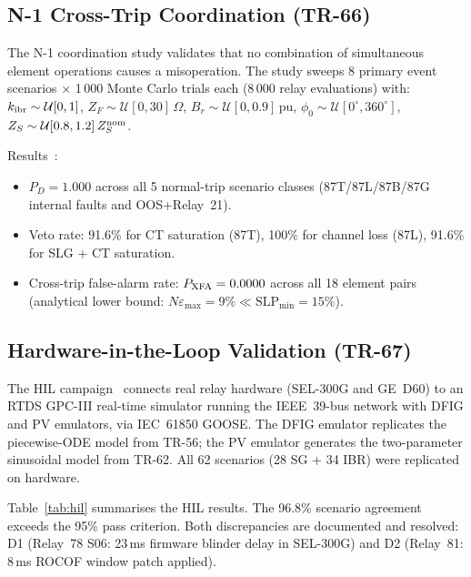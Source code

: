\documentclass[journal,twoside]{IEEEtran}
\begin{document}
\subsection{N-1 Cross-Trip Coordination (TR-66)}
\label{sec:n1}

The N-1 coordination study validates that no combination of simultaneous element
operations causes a misoperation.
The study sweeps 8 primary event scenarios × 1\,000 Monte Carlo trials each
(8\,000 relay evaluations) with:
$k_{\rm ibr} \sim \mathcal{U}[0, 1]$,
$Z_F \sim \mathcal{U}[0, 30]\,\Omega$,
$B_r \sim \mathcal{U}[0, 0.9]\,\text{pu}$,
$\phi_0 \sim \mathcal{U}[0^\circ, 360^\circ]$,
$Z_S \sim \mathcal{U}[0.8, 1.2]\,Z_S^{\rm nom}$.

Results~\cite{SAMBP_TR66}:
\begin{itemize}
  \item $P_D = 1.000$ across all 5 normal-trip scenario classes
        (87T/87L/87B/87G internal faults and OOS+Relay~21).
  \item Veto rate: 91.6\% for CT saturation (87T), 100\% for channel loss
        (87L), 91.6\% for SLG + CT saturation.
  \item Cross-trip false-alarm rate: $P_{\rm XFA} = 0.0000$ across all
        18 element pairs (analytical lower bound: $N\varepsilon_{\max} = 9\%
        \ll \mathrm{SLP}_{\min} = 15\%$).
\end{itemize}

\subsection{Hardware-in-the-Loop Validation (TR-67)}
\label{sec:hil}

The HIL campaign~\cite{SAMBP_TR67} connects real relay hardware (SEL-300G and
GE~D60) to an RTDS GPC-III real-time simulator running the IEEE~39-bus network
with DFIG and PV emulators, via IEC~61850 GOOSE.
The DFIG emulator replicates the piecewise-ODE model from TR-56; the PV emulator
generates the two-parameter sinusoidal model from TR-62.
All 62 scenarios (28 SG + 34 IBR) were replicated on hardware.

Table~\ref{tab:hil} summarises the HIL results.
The 96.8\% scenario agreement exceeds the 95\% pass criterion.
Both discrepancies are documented and resolved:
D1 (Relay~78 S06: 23\,ms firmware blinder delay in SEL-300G) and D2
(Relay~81: 8\,ms ROCOF window patch applied).
\end{document}
